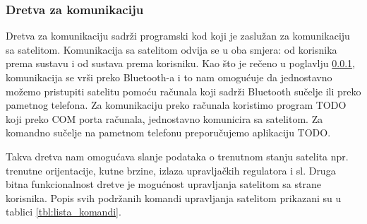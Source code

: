 \documentclass[times, utf8, diplomski, numeric]{templates/template}
\begin{document}
{{{            \subsubsection{Dretva za komunikaciju}{
                Dretva za komunikaciju sadrži programski kod koji je zaslužan za komunikaciju sa satelitom. Komunikacija sa satelitom odvija se u oba smjera: od korisnika prema sustavu i od sustava prema korisniku. Kao što je rečeno u poglavlju \ref{}, komunikacija se vrši preko Bluetooth-a i to nam omogućuje da jednostavno možemo pristupiti satelitu pomoću računala koji sadrži Bluetooth sučelje ili preko pametnog telefona. Za komunikaciju preko računala koristimo program TODO koji preko COM porta računala, jednostavno komunicira sa satelitom. Za komandno sučelje na pametnom telefonu preporučujemo aplikaciju TODO. 

                Takva dretva nam omogućava slanje podataka o trenutnom stanju satelita npr. trenutne orijentacije, kutne brzine, izlaza upravljačkih regulatora i sl. Druga bitna funkcionalnost dretve je mogućnost upravljanja satelitom sa strane korisnika. Popis svih podržanih komandi upravljanja satelitom prikazani su u tablici \ref{tbl:lista_komandi}.

}}}}
\end{document}
